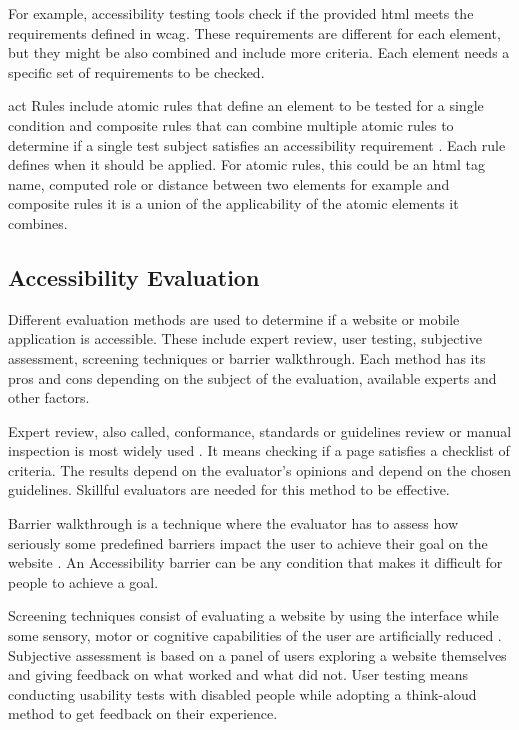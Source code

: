 \documentclass{master_thesis}
\begin{document}
For example, accessibility testing tools check if the provided \ac{html} meets the requirements defined in \ac{wcag}. These requirements are different for each element, but they might be also combined and include more criteria. Each element needs a specific set of requirements to be checked.

\ac{act} Rules include atomic rules that define an element to be tested for a single condition and composite rules that can combine multiple atomic rules to determine if a single test subject satisfies an accessibility requirement \citep{Fiers2019}. Each rule defines when it should be applied. For atomic rules, this could be an \ac{html} tag name, computed role or distance between two elements for example and composite rules it is a union of the applicability of the atomic elements it combines.

\subsection{Accessibility Evaluation}

Different evaluation methods are used to determine if a website or mobile application is accessible. These include expert review, user testing, subjective assessment, screening techniques or barrier walkthrough. Each method has its pros and cons depending on the subject of the evaluation, available experts and other factors.

Expert review, also called, conformance, standards or guidelines review or manual inspection is most widely used \citep{Brajnik2008}. It means checking if a page satisfies a checklist of criteria. The results depend on the evaluator's opinions and depend on the chosen guidelines. Skillful evaluators are needed for this method to be effective.

Barrier walkthrough is a technique where the evaluator has to assess how seriously some predefined barriers impact the user to achieve their goal on the website \citep{Brajnik2008}. An Accessibility barrier can be any condition that makes it difficult for people to achieve a goal.

Screening techniques consist of evaluating a website by using the interface while some sensory, motor or cognitive capabilities of the user are artificially reduced \citep{Brajnik2008}. Subjective assessment is based on a panel of users exploring a website themselves and giving feedback on what worked and what did not. User testing means conducting usability tests with disabled people while adopting a think-aloud method to get feedback on their experience.
\end{document}
